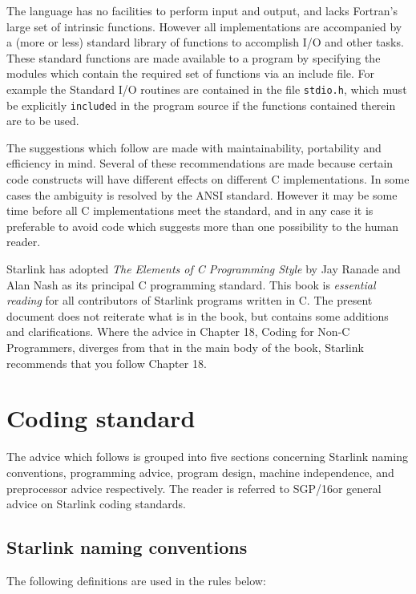 \documentclass[twoside,11pt]{article}
\newcommand{\xref}[3]{#1}
\begin{document}
The language has no facilities to perform input and output, and lacks 
Fortran's large set of intrinsic functions.
However all implementations are accompanied by a (more or less) standard 
library of functions to accomplish I/O and other tasks.
These standard functions are made available to  a program by specifying
the modules  which contain the required set of functions via an include file.
For example the Standard I/O routines are contained in the file {\tt stdio.h},
which must be explicitly {\tt include}d in the program source if the functions 
contained therein are to be used.

The suggestions which follow are made with maintainability, portability and 
efficiency in mind.
Several of these recommendations are made because certain code constructs 
will have different effects on different C  implementations.
In some cases the ambiguity is resolved by the ANSI  standard.
However it may be some time before all C implementations meet the standard,
and in any case it is preferable to avoid code which suggests more than one
possibility to the human reader.

Starlink has adopted {\sl The Elements of C Programming Style} by Jay Ranade 
and Alan Nash as its principal C programming standard.  This book is 
{\it essential reading}\/ for all contributors of Starlink programs written in 
C. The present document does not reiterate 
what is in the book, but contains some additions and clarifications.  Where 
the advice in Chapter 18, Coding for Non-C Programmers, diverges from 
that in the main body of the book, Starlink recommends that you follow  
Chapter 18.


\section{Coding standard}

The advice which follows is grouped into five sections concerning 
Starlink naming conventions, programming advice, program design, 
machine independence, and preprocessor advice respectively.  The reader is 
referred to \xref{SGP/16}{sgp16} for general advice on Starlink coding standards.

\subsection{Starlink naming conventions}

The following definitions are used in the rules below:
\end{document}
